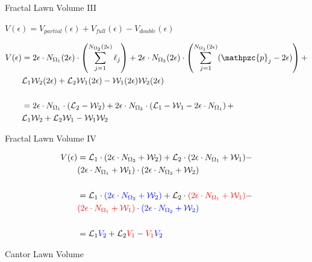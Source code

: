 \documentclass{if-beamer}
\newcommand{\SL}{\mathcal{L}}
\newcommand{\Om}{\Omega}
\newcommand{\W}{\mathcal{W}}
\newcommand{\p}{\mathpzc{p}}
\begin{document}
\begin{frame}{Fractal Lawn Volume III}

$V(\epsilon)=V_{partial}(\epsilon) + V_{full}(\epsilon) - V_{double}(\epsilon)$
\pause
\vspace{0.2in}

	\begin{align*}
	V(\epsilon)&=2\epsilon \cdot N_{\Om_1}(2\epsilon) \cdot \left(\sum_{j=1}^{N_{\Om_2}(2\epsilon)} \ell_j \right) + 2\epsilon \cdot N_{\Om_2}(2\epsilon) \cdot \left(\sum_{j=1}^{N_{\Om_1}(2\epsilon)} (\p_j - 2\epsilon) \right) + \\
	 &\SL_1 \W_2(2\epsilon) + \SL_2 \W_1(2\epsilon) - \W_1(2\epsilon) \W_2(2\epsilon) \\ \\
	&= 2\epsilon \cdot N_{\Om_1} \cdot (\SL_2 - \W_2) + 2\epsilon \cdot N_{\Om_2} \cdot \left( \SL_1 - \W_1 - 2\epsilon \cdot N_{\Om_1} \right) + \\
	 &\SL_1 \W_2 + \SL_2 \W_1 - \W_1 \W_2 
	\end{align*}
\end{frame}

\begin{frame}{Fractal Lawn Volume IV}
	\begin{center}
		\begin{align*}
		V(\epsilon) &= \SL_1 \cdot (2\epsilon \cdot N_{\Om_2} + \W_2) + \SL_2 \cdot (2\epsilon \cdot N_{\Om_1} + \W_1) - \\
		&(2\epsilon \cdot N_{\Om_1} + \W_1) \cdot (2\epsilon \cdot N_{\Om_2} + \W_2) \\ \\
		&= \SL_1 \cdot \textcolor{blue}{(2\epsilon \cdot N_{\Om_2} + \W_2) }+ \SL_2 \cdot \textcolor{red}{(2\epsilon \cdot N_{\Om_1} + \W_1)} - \\
		&\textcolor{red}{(2\epsilon \cdot N_{\Om_1} + \W_1)} \cdot \textcolor{blue}{(2\epsilon \cdot N_{\Om_2} + \W_2)} \\ \\
		&= \SL_1 \textcolor{blue}{V_2} + \SL_2 \textcolor{red}{V_1} - \textcolor{red}{V_1} \textcolor{blue}{V_2}
		\end{align*}
	\end{center}
\end{frame}

\begin{frame}{Cantor Lawn Volume}
	\begin{center}
	\end{center}
\end{frame}
\end{document}

